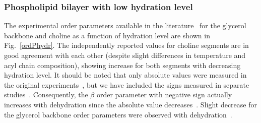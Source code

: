 \documentclass[journal=jacsat,manuscript=article]{achemso}
\begin{document}
\subsubsection{Phospholipid bilayer with low hydration level}
The experimental order parameters available in the literature~\cite{dvinskikh05b,ulrich94,bechinger91} 
for the glycerol backbone and choline as a function of hydration level are shown in Fig.~\ref{ordPhydr}. 
The independently reported values for choline segments are in good agreement with each other (despite 
slight differences in temperature and acyl chain composition),
showing increase for both segments with decreasing hydration level. It should be noted that only 
absolute values were measured in the original experiments~\cite{dvinskikh05b,ulrich94,bechinger91}, but
we have included the signs measured in separate studies~\cite{hong95a,hong95b,gross97}. 
Consequently, the $\beta$ order parameter with negative sign actually increases with dehydration 
since the absolute value decreases~\cite{dvinskikh05b,ulrich94,bechinger91}.
Slight decrease for the glycerol backbone order parameters were observed with dehydration~\cite{dvinskikh05b}.
\end{document}

